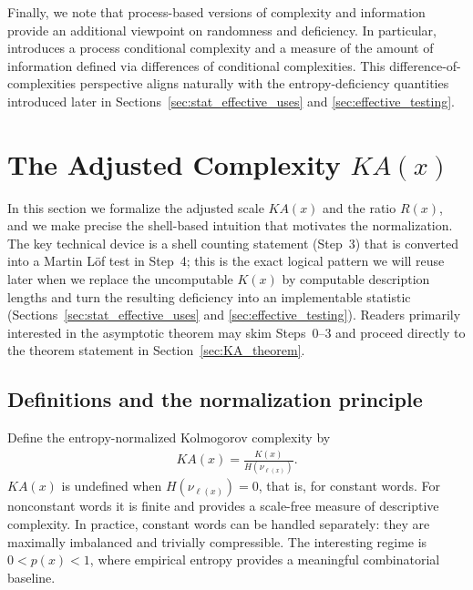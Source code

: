 \documentclass[12pt]{article}
\newcommand{\be}{\begin{eqnarray}}
\newcommand{\ee}{\end{eqnarray}}
\begin{document}
Finally, we note that process-based versions of complexity and information
provide an additional viewpoint on randomness and deficiency. In particular,
\citet{Vidakovic1983Process} introduces a process conditional complexity and a
measure of the amount of information defined via differences of conditional
complexities. This difference-of-complexities perspective aligns naturally with
the entropy-deficiency quantities introduced later in
Sections~\ref{sec:stat_effective_uses} and \ref{sec:effective_testing}.

\section{The Adjusted Complexity $KA(x)$}
\label{sec:KA}

In this section we formalize the adjusted scale $KA(x)$ and the ratio $R(x)$, and we make precise the shell-based intuition that motivates the normalization. The key technical device is a shell counting statement (Step~3) that is converted into a Martin L\"of test in Step~4; this is the exact logical pattern we will reuse later when we replace the uncomputable $K(x)$ by computable description lengths and turn the resulting deficiency into an implementable statistic (Sections~\ref{sec:stat_effective_uses} and \ref{sec:effective_testing}). Readers primarily interested in the asymptotic theorem may skim Steps~0--3 and proceed directly to the theorem statement in Section~\ref{sec:KA_theorem}.

\subsection*{Definitions and the normalization principle}

Define the entropy-normalized Kolmogorov complexity by
\be
KA(x)=\frac{K(x)}{H(\nu_{\ell(x)})}.
\label{eq:KA_def_main}
\ee
$KA(x)$ is undefined when $H(\nu_{\ell(x)})=0$, that is, for constant words.
For nonconstant words it is finite and provides a scale-free measure of descriptive complexity.
In practice, constant words can be handled separately: they are maximally imbalanced and trivially compressible. The interesting regime is $0<p(x)<1$, where empirical entropy provides a meaningful combinatorial baseline.
\end{document}
